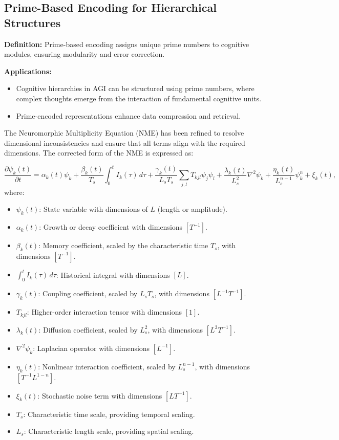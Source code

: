 \documentclass{article}
\theoremstyle{plain}
\begin{document}
\begin{itemize}
\begin{itemize}
\subsection{Prime-Based Encoding for Hierarchical Structures}
\textbf{Definition:} Prime-based encoding assigns unique prime numbers to cognitive modules, ensuring modularity and error correction.

\textbf{Applications:}
\begin{itemize}
    \item Cognitive hierarchies in AGI can be structured using prime numbers, where complex thoughts emerge from the interaction of fundamental cognitive units.
    \item Prime-encoded representations enhance data compression and retrieval.
\end{itemize}

The Neuromorphic Multiplicity Equation (NME) has been refined to resolve dimensional inconsistencies and ensure that all terms align with the required dimensions. The corrected form of the NME is expressed as:

\begin{equation}
\frac{\partial \psi_k(t)}{\partial t} = \alpha_k(t) \psi_k + \frac{\beta_k(t)}{T_s} \int_0^t I_k(\tau) \, d\tau + \frac{\gamma_k(t)}{L_s T_s} \sum_{j,l} T_{kjl} \psi_j \psi_l + \frac{\lambda_k(t)}{L_s^2} \nabla^2 \psi_k + \frac{\eta_k(t)}{L_s^{n-1}} \psi_k^n + \xi_k(t),
\end{equation}
where:
\begin{itemize}
    \item \(\psi_k(t)\): State variable with dimensions of \(L\) (length or amplitude).
    \item \(\alpha_k(t)\): Growth or decay coefficient with dimensions \([T^{-1}]\).
    \item \(\beta_k(t)\): Memory coefficient, scaled by the characteristic time \(T_s\), with dimensions \([T^{-1}]\).
    \item \(\int_0^t I_k(\tau) \, d\tau\): Historical integral with dimensions \([L]\).
    \item \(\gamma_k(t)\): Coupling coefficient, scaled by \(L_s T_s\), with dimensions \([L^{-1} T^{-1}]\).
    \item \(T_{kjl}\): Higher-order interaction tensor with dimensions \([1]\).
    \item \(\lambda_k(t)\): Diffusion coefficient, scaled by \(L_s^2\), with dimensions \([L^3 T^{-1}]\).
    \item \(\nabla^2 \psi_k\): Laplacian operator with dimensions \([L^{-1}]\).
    \item \(\eta_k(t)\): Nonlinear interaction coefficient, scaled by \(L_s^{n-1}\), with dimensions \([T^{-1} L^{1-n}]\).
    \item \(\xi_k(t)\): Stochastic noise term with dimensions \([L T^{-1}]\).
    \item \(T_s\): Characteristic time scale, providing temporal scaling.
    \item \(L_s\): Characteristic length scale, providing spatial scaling.
\end{itemize}


\end{itemize}
\end{itemize}
\end{document}
